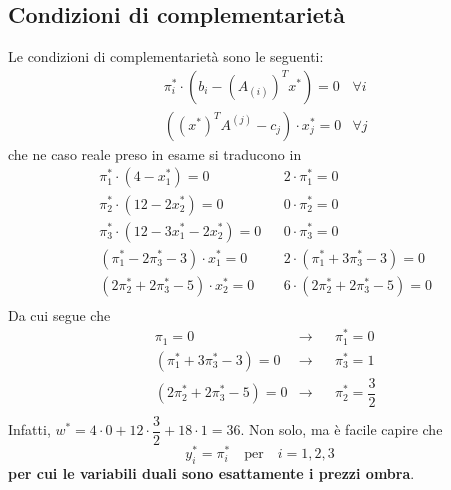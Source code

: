 \documentclass[a4paper]{extarticle}
\begin{document}
\subsection{Condizioni di complementarietà}
Le condizioni di complementarietà sono le seguenti:
\begin{align*}
    &\pi_i^* \cdot (b_i-(A_{(i)})^Tx^*) = 0  & \forall i\\
    &((x^*)^T A^{(j)} - c_j) \cdot x_j^* = 0 & \forall j
\end{align*}
che ne caso reale preso in esame si traducono in
\begin{align*}
    & \pi_1^* \cdot (4-x_1^*)=0 && 2 \cdot \pi_1^*=0\\
    & \pi_2^* \cdot (12-2x_2^*)=0 && 0 \cdot \pi_2^*=0\\
    & \pi_3^* \cdot (12-3x_1^*-2x_2^*)=0 && 0 \cdot \pi_3^*=0\\
    & (\pi_1^*-2 \pi_3^* - 3) \cdot x_1^*=0 && 2 \cdot (\pi_1^*+3\pi_3^*-3)=0\\
    & (2\pi_2^*+2 \pi_3^* - 5) \cdot x_2^*=0 && 6 \cdot (2\pi_2^*+2 \pi_3^* - 5)=0\\
\end{align*}
Da cui segue che
\begin{align*}
    & \pi_1=0 & \rightarrow && \pi_1^*=0\\
    & (\pi_1^*+3\pi_3^*-3)=0 & \rightarrow && \pi_3^*=1\\
    & (2\pi_2^*+2\pi_3^*-5)=0 & \rightarrow && \pi_2^*=\dfrac{3}{2}\\
\end{align*}
Infatti, $w^*=4 \cdot 0 + 12 \cdot \dfrac{3}{2} + 18 \cdot 1 = 36$. Non solo, ma è facile capire che
\[y_i^* = \pi_i^* \hspace{1em} \text{per} \hspace{1em} i=1,2,3\]
\textbf{per cui le variabili duali sono esattamente i prezzi ombra}.
\end{document}

